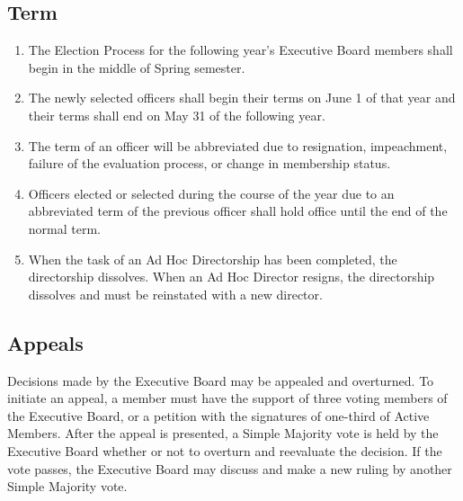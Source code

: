 \documentclass{article}
\newcommand{\asection}[1]{\subsection{#1} \label{#1}}
\begin{document}
\asection{Term}
\begin{enumerate}
\item The Election Process for the following year's Executive Board members shall begin in the middle of Spring semester.
\item The newly selected officers shall begin their terms on June 1 of that year and their terms shall end on May 31 of the following year.
\item The term of an officer will be abbreviated due to resignation, impeachment, failure of the evaluation process, or change in membership status.
\item Officers elected or selected during the course of the year due to an abbreviated term of the previous officer shall hold office until the end of the normal term.
\item When the task of an Ad Hoc Directorship has been completed, the directorship dissolves.
	When an Ad Hoc Director resigns, the directorship dissolves and must be reinstated with a new director.
\end{enumerate}

\asection{Appeals}
Decisions made by the Executive Board may be appealed and overturned.
To initiate an appeal, a member must have the support of three voting members of the Executive Board, or a petition with the signatures of one-third of Active Members.
After the appeal is presented, a Simple Majority vote is held by the Executive Board whether or not to overturn and reevaluate the decision.
If the vote passes, the Executive Board may discuss and make a new ruling by another Simple Majority vote.
\end{document}
